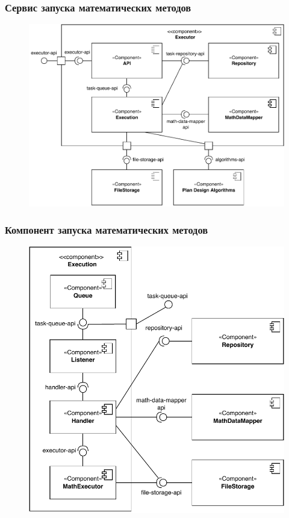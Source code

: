 \begin{frame}
\frametitle{Сервис запуска математических методов}
\begin{figure}
    \includegraphics[scale=.6]{pictures/architecture/executor_component_common}
\end{figure}
\end{frame}

\begin{frame}
\frametitle{Компонент запуска математических методов}
\begin{figure}
    \includegraphics[scale=.5]{pictures/architecture/executor_component_detailed}
\end{figure}
\end{frame}


